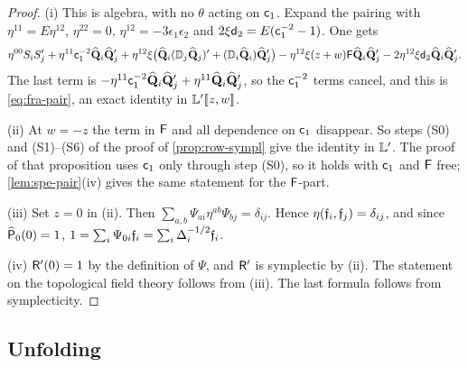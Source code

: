 \begin{proof}
(i) This is algebra, with no $\theta$ acting on $\mathsf{c}_{1}$. Expand the pairing with $\eta^{11}=E\eta^{12}$, $\eta^{22}=0$, $\eta^{12}=-3\epsilon_1\epsilon_2$ and $2\xi\mathsf{d}_{2}=E(\mathsf{c}_{1}^{-2}-1)$. One gets
\[
\eta^{00}S_iS_j'+\eta^{11}\mathsf{c}_{1}^{-2}\widehat{\mathbf{Q}}_i\widehat{\mathbf{Q}}_j'+\eta^{12}\xi\big(\widehat{\mathbf{Q}}_i(\mathbb{D}_j\widehat{\mathbf{Q}}_j)'+(\mathbb{D}_i\widehat{\mathbf{Q}}_i)\widehat{\mathbf{Q}}_j'\big)-\eta^{12}\xi(z+w)\mathsf{F}\widehat{\mathbf{Q}}_i\widehat{\mathbf{Q}}_j'-2\eta^{12}\xi\mathsf{d}_{2}\widehat{\mathbf{Q}}_i\widehat{\mathbf{Q}}_j'.
\]
The last term is $-\eta^{11}\mathsf{c}_{1}^{-2}\widehat{\mathbf{Q}}_i\widehat{\mathbf{Q}}_j'+\eta^{11}\widehat{\mathbf{Q}}_i\widehat{\mathbf{Q}}_j'$, so the $\mathsf{c}_{1}^{-2}$ terms cancel, and this is \eqref{eq:fra-pair}, an exact identity in $\mathbb{L}'[\![ z,w ]\!]$.

(ii) At $w=-z$ the term in $\mathsf{F}$ and all dependence on $\mathsf{c}_{1}$ disappear. So steps (S0) and (S1)--(S6) of the proof of \cref{prop:row-sympl} give the identity in $\mathbb{L}'$. The proof of that proposition uses $\mathsf{c}_{1}$ only through step (S0), so it holds with $\mathsf{c}_{1}$ and $\mathsf{F}$ free; \cref{lem:spe-pair}(iv) gives the same statement for the $\mathsf{F}$-part.

(iii) Set $z=0$ in (ii). Then $\sum_{a,b}\Psi_{ai}\eta^{ab}\Psi_{bj}=\delta_{ij}$. Hence $\eta(\mathfrak{f}_i,\mathfrak{f}_j)=\delta_{ij}$, and since $\widehat{\mathsf{P}}_0(0)=1$, $1=\sum_i\Psi_{0i}\mathfrak{f}_i=\sum_i\Delta_i^{-1/2}\mathfrak{f}_i$.

(iv) $\mathsf{R}'(0)=1$ by the definition of $\Psi$, and $\mathsf{R}'$ is symplectic by (ii). The statement on the topological field theory follows from (iii). The last formula follows from symplecticity.
\end{proof}

\subsection{Unfolding}

